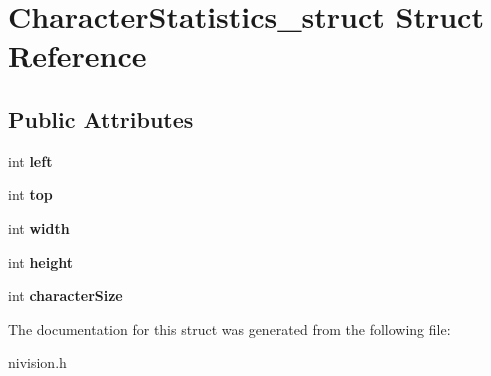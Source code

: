 \hypertarget{structCharacterStatistics__struct}{
\section{CharacterStatistics\_\-struct Struct Reference}
\label{structCharacterStatistics__struct}
}
\subsection*{Public Attributes}
\begin{DoxyCompactItemize}
\item 
\hypertarget{structCharacterStatistics__struct_a95a86971db14027020e5627684e8dbcd}{
int {\bfseries left}}
\label{structCharacterStatistics__struct_a95a86971db14027020e5627684e8dbcd}

\item 
\hypertarget{structCharacterStatistics__struct_ae999a3ffa6542faf6b9070114d70446f}{
int {\bfseries top}}
\label{structCharacterStatistics__struct_ae999a3ffa6542faf6b9070114d70446f}

\item 
\hypertarget{structCharacterStatistics__struct_ab9db5dd5e023bfb437a9158f5d4a7f4a}{
int {\bfseries width}}
\label{structCharacterStatistics__struct_ab9db5dd5e023bfb437a9158f5d4a7f4a}

\item 
\hypertarget{structCharacterStatistics__struct_a21d88abb2b9f4940602916d352e7b124}{
int {\bfseries height}}
\label{structCharacterStatistics__struct_a21d88abb2b9f4940602916d352e7b124}

\item 
\hypertarget{structCharacterStatistics__struct_aead1343945172e4583abd53c8d2babd5}{
int {\bfseries characterSize}}
\label{structCharacterStatistics__struct_aead1343945172e4583abd53c8d2babd5}

\end{DoxyCompactItemize}


The documentation for this struct was generated from the following file:\begin{DoxyCompactItemize}
\item 
nivision.h\end{DoxyCompactItemize}
